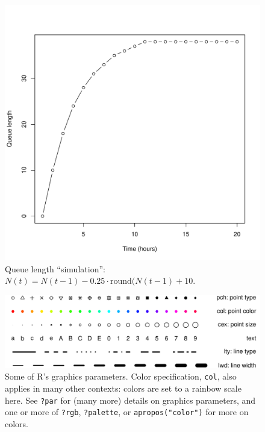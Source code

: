 \documentclass[11pt]{article}\usepackage[]{graphicx}\usepackage[]{color}
\makeatletter
\def\maxwidth{ %
  \ifdim\Gin@nat@width>\linewidth
    \linewidth
  \else
    \Gin@nat@width
  \fi
}
\newenvironment{knitrout}{}{} %
\newcommand{\code}[1]{{\tt #1}}
\newcommand\R{{\sf R}}
\numberwithin{exercise}{section}
\makeatother
\begin{document}
\begin{figure}
  \begin{center}
\begin{knitrout}
\color{fgcolor}
\includegraphics[width=\maxwidth]{figure/qfig1} 

\end{knitrout}
\end{center}
\caption{Queue length ``simulation'': $N(t)=N(t-1)-0.25 \cdot \mbox{round}(N(t-1)+10$.}
\label{fig:queue1}
\end{figure}

\begin{figure}
\begin{center}
\begin{knitrout}
\color{fgcolor}
\includegraphics[width=\maxwidth]{figure/chlorfig1} 

\end{knitrout}
\end{center}
\caption{Some of \R's graphics parameters.
Color specification, \code{col}, also applies in many other contexts:
colors are set to a rainbow scale here.  
See \code{?par}
for (many more) details on graphics parameters,
and one or more of \code{?rgb}, \code{?palette},
or \code{apropos("color")} for more on colors.}
\label{fig:graphparms}
\end{figure}
\end{document}
